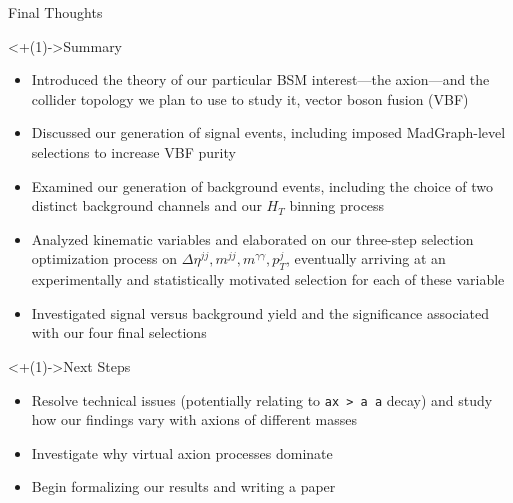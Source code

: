 \documentclass[handout]{beamer}
\begin{document}
\begin{frame}{Final Thoughts}
    \begin{block}<+(1)->{Summary}
        \begin{itemize}[<+(1)->]
            \item Introduced the theory of our particular BSM interest---the axion---and the collider topology we plan to use to study it, vector boson fusion (VBF)
            \item Discussed our generation of signal events, including imposed MadGraph-level selections to increase VBF purity
            \item Examined our generation of background events, including the choice of two distinct background channels and our $H_T$ binning process
            \item Analyzed kinematic variables and elaborated on our three-step selection optimization process on $\Delta \eta^{jj}, m^{jj}, m^{\gamma \gamma}, p_T^j$, eventually arriving at an experimentally and statistically motivated selection for each of these variable
            \item Investigated signal versus background yield and the significance associated with our four final selections
        \end{itemize}
    \end{block}
    
    \smallskip
    
    \begin{block}<+(1)->{Next Steps}
            \begin{itemize}[<+(1)->]
                \item Resolve technical issues (potentially relating to \texttt{ax > a a} decay) and study how our findings vary with axions of different masses
                \item Investigate why virtual axion processes dominate
                \item Begin formalizing our results and writing a paper  
            \end{itemize}
    \end{block}
\end{frame}
\end{document}
